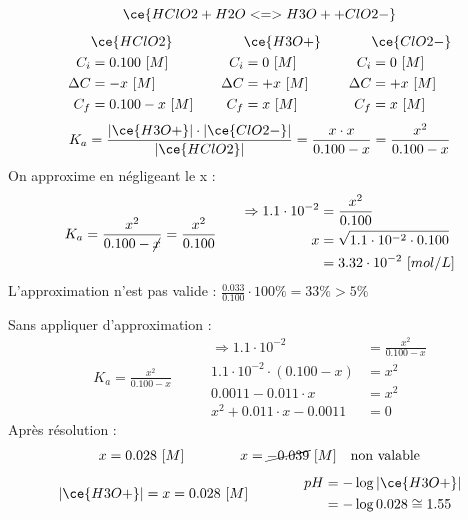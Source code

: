\documentclass[
  11pt,
  french,
  a4paper,
  openany]{book}
\begin{document}
\begin{Answer}
\[
\ce{HClO2 + H2O <=> H3O+ + ClO2-}
\]
\[
\begin{split}
&\ce{HClO2}\\
C_i &= 0.100\ [M] \\
\Delta C &= - x\ [M] \\
C_f &= 0.100 - x\ [M] \\
\end{split}
\qquad
\begin{split}
&\ce{H3O+}\\
C_i &= 0\ [M] \\
\Delta C &= + x\ [M] \\
C_f &= x\ [M] \\
\end{split}
\qquad
\begin{split}
&\ce{ClO2-}\\
C_i &= 0\ [M] \\
\Delta C &= + x\ [M] \\
C_f &= x\ [M] \\
\end{split}
\]
\[
K_a = \frac{|\ce{H3O+}| \cdot |\ce{ClO2-}|}{|\ce{HClO2}|} = \frac{x \cdot x}{0.100-x} = \frac{x^2}{0.100-x}
\]
On approxime en négligeant le x :
\[
\begin{split}
K_a = \frac{x^2}{0.100-\cancel{x}} = \frac{x^2}{0.100}
\end{split}
\qquad
\begin{split}
\Rightarrow 1.1 \cdot 10^{-2} &= \frac{x^2}{0.100} \\
x &= \sqrt{1.1 \cdot 10^{-2} \cdot 0.100} \\
&= 3.32 \cdot 10^{-2}\ [mol/L]
\end{split}
\]
L'approximation n'est pas valide : \(\frac{0.033}{0.100} \cdot 100\% = 33\% > 5\%\)

Sans appliquer d'approximation :
\[
\begin{split}
K_a = \frac{x^2}{0.100-x}
\end{split}
\qquad
\begin{split}
\Rightarrow 1.1 \cdot 10^{-2} &= \frac{x^2}{0.100-x} \\
1.1 \cdot 10^{-2} \cdot (0.100-x) &= x^2 \\
0.0011 - 0.011 \cdot x &= x^2 \\
x^2 + 0.011 \cdot x - 0.0011 &= 0
\end{split}
\]
Après résolution :
\[
\begin{split}
x = 0.028\ [M]
\end{split}
\qquad\qquad
\begin{split}
x = \cancel{-0.039}\ [M] \quad \text{non valable}
\end{split}
\]
\[
\begin{split}
|\ce{H3O+}| = x = 0.028\ [M]
\end{split}
\qquad\qquad
\begin{split}
pH &= - \log |\ce{H3O+}| \\
 &= - \log 0.028 \cong 1.55
\end{split}
\]

\end{Answer}
\end{document}
